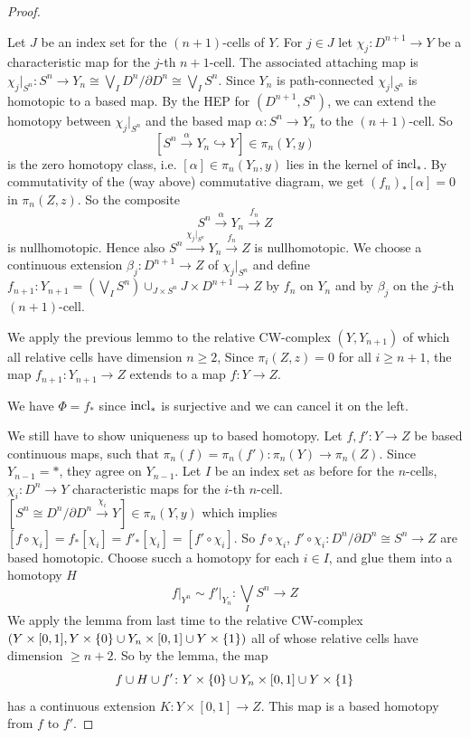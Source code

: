 \documentclass[language=english]{TemplateLecture}
\begin{document}
\begin{proof}
\begin{description}
        Let \(J\) be an index set for the \((n+1)\)-cells of \(Y\). For \(j \in J\) let \(\chi_j\colon D^{n+1}\to Y\) be a characteristic map for the \(j\)-th \(n+1\)-cell. The associated attaching map is \(\chi_j\rvert_{S^n}\colon S^n \to Y_n \cong \bigvee_I D^n/ \partial D^n \cong \bigvee_I S^n\). Since \(Y_n\) is path-connected \(\chi_j\rvert_{S^n}\) is homotopic to a based map. By the HEP for \((D^{n+1}, S^n)\), we can extend the homotopy between \(\chi_j\rvert_{S^n}\) and the based map \(\alpha\colon S^n \to Y_n\) to the \((n+1)\)-cell. So
        \[[S^n \xrightarrow{\alpha} Y_n \hookrightarrow Y] \in \pi_n(Y,y)\]
        is the zero homotopy class, i.e. \([\alpha] \in \pi_n(Y_n, y)\) lies in the kernel of \(\operatorname{incl}_*\). By commutativity of the (way above) commutative diagram, we get \((f_n)_*[\alpha] = 0\) in \(\pi_n(Z, z)\). So the composite
        \[S^n \xrightarrow{\alpha} Y_n \xrightarrow{f_n} Z\]
        is nullhomotopic. Hence also \(S^n \xrightarrow{\chi_j\rvert_{S^n}} Y_n \xrightarrow{f_n} Z\) is nullhomotopic. We choose a continuous extension \(\beta_j\colon D^{n+1} \to Z\) of \(\chi_j\rvert_{S^n}\) and define \(f_{n+1}\colon Y_{n+1}= (\bigvee_I S^n) \cup_{J\times S^n} J\times D^{n+1}\to Z\) by \(f_n\) on \(Y_n\) and by \(\beta_j\) on the \(j\)-th \((n+1)\)-cell.
        \item[Step 3] We apply the previous lemmo to the relative CW-complex \((Y, Y_{n+1})\) of which all relative cells have dimension \(n\geq 2\), Since \(\pi_i(Z,z) = 0\) for all \(i \geq n+1\), the map \(f_{n+1}\colon Y_{n+1}\to Z\) extends to a map \(f\colon Y \to Z\).
        
        We have \(\Phi = f_*\) since \(\operatorname{incl}_*\) is surjective and we can cancel it on the left.
    \end{description}

    We still have to show uniqueness up to based homotopy. Let \(f, f'\colon Y\to Z\) be based continuous maps, such that \(\pi_n(f) = \pi_n(f')\colon \pi_n(Y)\to \pi_n(Z)\). Since \(Y_{n-1} = {*}\), they agree on \(Y_{n-1}\). Let \(I\) be an index set as before for the \(n\)-cells, \(\chi_i\colon D^n \to Y\) characteristic maps for the \(i\)-th \(n\)-cell. \([S^n\cong D^n/\partial D^n \xrightarrow{\chi_i} Y] \in \pi_n(Y, y)\) which implies \([f \circ \chi_i] = f_*[\chi_i] = f'_*[\chi_i] = [f'\circ \chi_i]\). So \(f\circ \chi_i\), \(f'\circ \chi_i\colon D^n/\partial D^n \cong S^n \to Z\) are based homotopic. Choose succh a homotopy for each \(i\in I\), and glue them into a homotopy \(H\)
    \[f\rvert_{Y^n}\sim f'\rvert_{Y_n} \colon \bigvee_I S^n \to Z\]
    We apply the lemma from last time to the relative CW-complex \((Y\times [0,1], Y\times \{0\} \cup Y_n\times [0,1]\cup Y\times \{1\})\) all of whose relative cells have dimension \(\geq n+2\). So by the lemma, the map
    \[f\cup H \cup f'\colon Y\times \{0\} \cup Y_n \times [0,1] \cup Y\times \{1\}\]
    has a continuous extension \(K\colon Y\times [0,1]\to Z\). This map is a based homotopy from \(f\) to \(f'\).
\end{proof}
\end{document}
